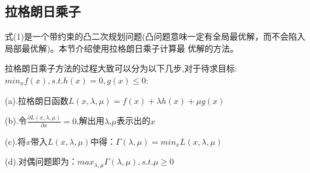 \documentclass[UTF8]{ctexart}
\begin{document}
{\subsection{拉格朗日乘子}
式(1)是一个带约束的凸二次规划问题(凸问题意味一定有全局最优解，而不会陷入局部最优解)。本节介绍使用拉格朗日乘子计算最
优解的方法。\par
拉格朗日乘子方法的过程大致可以分为以下几步,对于待求目标:$min_xf(x),s.t.h(x)=0,g(x)\leq0$:\par
(a).拉格朗日函数$L(x,\lambda,\mu)=f(x)+\lambda h(x)+\mu g(x)$\par
(b).令$\frac{\partial L(x,\lambda,\mu)}{\partial x}=0$,解出用$\lambda$,$\mu$表示出的$x$\par
(c).将$x$带入$L(x,\lambda,\mu)$中得：$\Gamma(\lambda,\mu)=min_xL(x,\lambda,\mu)$\par
(d).对偶问题即为：$max_{\lambda,\mu}\Gamma(\lambda,\mu),s.t.\mu\geq0$\par
}
\end{document}
